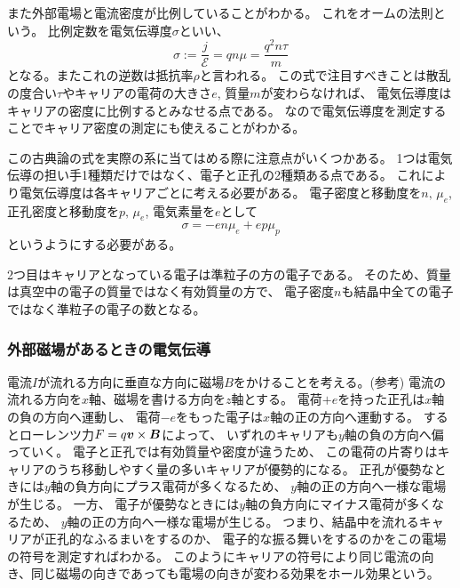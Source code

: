 \documentclass[11pt,dvipdfmx,a4paper]{jsarticle}
\numberwithin{equation}{section}
\begin{document}
また外部電場と電流密度が比例していることがわかる。
これをオームの法則という。
比例定数を電気伝導度\(\sigma\)といい、
\begin{equation}
	\sigma := \frac{j}{\mathscr{E}} = qn\mu = \frac{q^2n\tau}{m}
\end{equation}
となる。またこれの逆数は抵抗率\(\rho\)と言われる。
この式で注目すべきことは散乱の度合い\(\tau\)やキャリアの電荷の大きさ\(e\), 質量\(m\)が変わらなければ、
電気伝導度はキャリアの密度に比例するとみなせる点である。
なので電気伝導度を測定することでキャリア密度の測定にも使えることがわかる。

この古典論の式を実際の系に当てはめる際に注意点がいくつかある。
1つは電気伝導の担い手1種類だけではなく、電子と正孔の2種類ある点である。
これにより電気伝導度は各キャリアごとに考える必要がある。
電子密度と移動度を\(n,\,\mu_e\), 正孔密度と移動度を\(p,\,\mu_e\), 電気素量を\(e\)として
\begin{equation}
	\sigma = -en\mu_e +e p\mu_p
\end{equation}
というようにする必要がある。

2つ目はキャリアとなっている電子は準粒子の方の電子である。
そのため、質量は真空中の電子の質量ではなく有効質量の方で、
電子密度\(n\)も結晶中全ての電子ではなく準粒子の電子の数となる。

\subsubsection*{外部磁場があるときの電気伝導}
電流\(I\)が流れる方向に垂直な方向に磁場\(B\)をかけることを考える。(参考\cite{kondo-2009})
電流の流れる方向を\(x\)軸、磁場を書ける方向を\(z\)軸とする。
電荷\(+e\)を持った正孔は\(x\)軸の負の方向へ運動し、
電荷\(-e\)をもった電子は\(x\)軸の正の方向へ運動する。
するとローレンツ力\(F = q\vb*{v}\times\vb*{B}\)によって、
いずれのキャリアも\(y\)軸の負の方向へ偏っていく。
電子と正孔では有効質量や密度が違うため、
この電荷の片寄りはキャリアのうち移動しやすく量の多いキャリアが優勢的になる。
正孔が優勢なときには\(y\)軸の負方向にプラス電荷が多くなるため、
\(y\)軸の正の方向へ一様な電場が生じる。
一方、
電子が優勢なときには\(y\)軸の負方向にマイナス電荷が多くなるため、
\(y\)軸の正の方向へ一様な電場が生じる。
つまり、結晶中を流れるキャリアが正孔的なふるまいをするのか、
電子的な振る舞いをするのかをこの電場の符号を測定すればわかる。
このようにキャリアの符号により同じ電流の向き、同じ磁場の向きであっても電場の向きが変わる効果をホール効果という。
\end{document}
